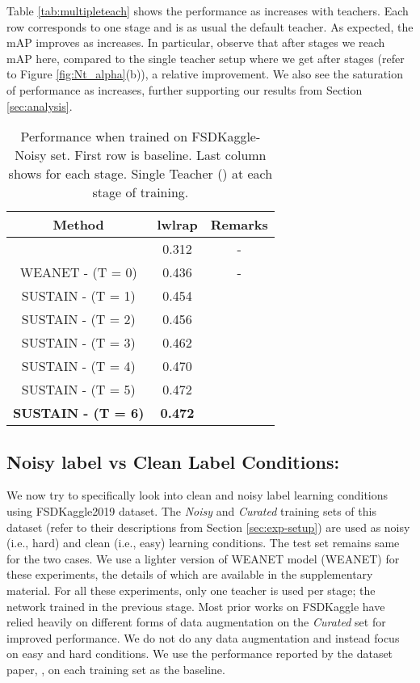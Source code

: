 \documentclass{article}
\begin{document}
Table \ref{tab:multipleteach} shows the performance as  increases with  teachers. 
Each row corresponds to one stage and  is as usual the default teacher. 
As expected, the mAP improves as  increases. 
In particular, observe that after  stages we reach  mAP here, compared to the single teacher setup where we get  after  stages (refer to Figure \ref{fig:Nt_alpha}(b)), a  relative improvement. 
We also see the saturation of performance as  increases, further supporting our results from Section \ref{sec:analysis}.

\begin{table}[t!]
  \centering
\begin{tabular}{c|c|c}
    \toprule
	Method & lwlrap & Remarks\\
    \toprule
    \cite{fonseca2019audio} & 0.312 & -\\
	\midrule 
	WEANET - (T = 0) & 0.436 & -\\ 
	\midrule
	SUSTAIN - (T = 1) & 0.454 &  \\
	SUSTAIN - (T = 2) & 0.456 &  \\
	SUSTAIN - (T = 3) & 0.462 &  \\
	SUSTAIN - (T = 4) & 0.470 &  \\
	SUSTAIN - (T = 5) & 0.472 &  \\
	\textbf{SUSTAIN - (T = 6)} & \textbf{0.472} &  \\
	
	\bottomrule
    \end{tabular}\caption{Performance when trained on FSDKaggle-Noisy set. First row is baseline. Last column shows  for each stage. Single Teacher ()  at each  stage of training. }
  \label{tab:fsdnoisy}\end{table}

\subsection{Noisy label vs Clean Label Conditions:}

We now try to specifically look into clean and noisy label learning conditions using FSDKaggle2019 dataset. 
The \emph{Noisy} and \emph{Curated} training sets of this dataset (refer to their descriptions from Section \ref{sec:exp-setup}) are used as noisy (i.e., hard) and clean (i.e., easy) learning conditions. 
The test set remains same for the two cases. 
We use a lighter version of WEANET model (WEANET) for these experiments, the details of which are available in the supplementary material. For all these experiments, only one teacher is used per stage; the network trained in the previous stage. Most prior works on FSDKaggle have relied heavily on different forms of data augmentation on the \emph{Curated} set for improved performance. We do not do any data augmentation and instead focus  on easy and hard conditions. We use the performance reported by the dataset paper, \cite{fonseca2019learning}, on each training set as the baseline. 
\end{document}
